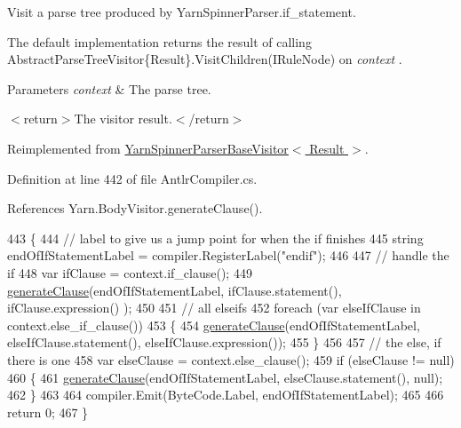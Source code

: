 Visit a parse tree produced by Yarn\-Spinner\-Parser.\-if\-\_\-statement. 

The default implementation returns the result of calling Abstract\-Parse\-Tree\-Visitor\{\-Result\}.\-Visit\-Children(\-I\-Rule\-Node) on {\itshape context} . 


\begin{DoxyParams}{Parameters}
{\em context} & The parse tree.\\
\hline
\end{DoxyParams}
$<$return$>$The visitor result.$<$/return$>$ 

Reimplemented from \hyperlink{a00197_a005f9655da52de2581762a4b61912ecd}{Yarn\-Spinner\-Parser\-Base\-Visitor$<$ Result $>$}.



Definition at line 442 of file Antlr\-Compiler.\-cs.



References Yarn.\-Body\-Visitor.\-generate\-Clause().


\begin{DoxyCode}
443         \{
444             \textcolor{comment}{// label to give us a jump point for when the if finishes}
445             \textcolor{keywordtype}{string} endOfIfStatementLabel = compiler.RegisterLabel(\textcolor{stringliteral}{"endif"});
446 
447             \textcolor{comment}{// handle the if}
448             var ifClause = context.if\_clause();
449             \hyperlink{a00044_a5f246aeaea2ba795d78abb0f8918cca4}{generateClause}(endOfIfStatementLabel, ifClause.statement(), ifClause.expression()
      );
450 
451             \textcolor{comment}{// all elseifs}
452             \textcolor{keywordflow}{foreach} (var elseIfClause \textcolor{keywordflow}{in} context.else\_if\_clause())
453             \{
454                 \hyperlink{a00044_a5f246aeaea2ba795d78abb0f8918cca4}{generateClause}(endOfIfStatementLabel, elseIfClause.statement(), 
      elseIfClause.expression());
455             \}
456 
457             \textcolor{comment}{// the else, if there is one}
458             var elseClause = context.else\_clause();
459             \textcolor{keywordflow}{if} (elseClause != null)
460             \{
461                 \hyperlink{a00044_a5f246aeaea2ba795d78abb0f8918cca4}{generateClause}(endOfIfStatementLabel, elseClause.statement(), null);
462             \}
463 
464             compiler.Emit(ByteCode.Label, endOfIfStatementLabel);
465 
466             \textcolor{keywordflow}{return} 0;
467         \}
\end{DoxyCode}


